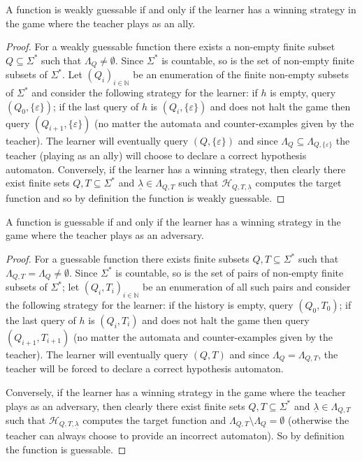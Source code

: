 \documentclass{lmcs}
\numberwithin{theorem}{section}
\begin{document}
\begin{prop}
A function is weakly guessable if and only if the learner has a winning strategy in the game where the teacher plays as an ally. 
\end{prop}

\begin{proof}
For a weakly guessable function there exists a non-empty finite subset $Q \subseteq \Sigma^*$ such that $\Lambda_{Q} \neq \emptyset$. Since $\Sigma^*$ is countable, so is the set of non-empty finite subsets of $\Sigma^*$. Let $(Q_i)_{i\in \mathbb{N}}$ be an enumeration of the finite non-empty subsets of $\Sigma^*$ and consider the following strategy for the learner: if $h$ is empty, query $(Q_0, \{\varepsilon\})$; if the last query of $h$ is $(Q_i, \{\varepsilon\})$ and does not halt the game then query $(Q_{i+1}, \{\varepsilon\})$ (no matter the automata and counter-examples given by the teacher). The learner will eventually query $(Q,\{\varepsilon\})$ and since $\Lambda_{Q} \subseteq \Lambda_{Q,\{\varepsilon\}}$ the teacher (playing as an ally) will choose to declare a correct hypothesis automaton. Conversely, if the learner has a winning strategy, then clearly there exist finite sets $Q, T \subseteq \Sigma^*$ and $\underline{\lambda} \in \Lambda_{Q, T}$ such that $\mathcal{H}_{Q, T, \underline{\lambda}}$ computes the target function and so by definition the function is weakly guessable.
\end{proof}

\begin{prop}
\label{prop:guessgame}A function is guessable if and only if the learner has a winning strategy in the game where the teacher plays as an adversary. 
\end{prop}

\begin{proof}
For a guessable function there exists finite subsets $Q, T \subseteq \Sigma^*$ such that $\Lambda_{Q,T} = \Lambda_{Q} \neq \emptyset$. Since $\Sigma^*$ is countable, so is the set of pairs of non-empty finite subsets of $\Sigma^*$; let $(Q_i, T_i)_{i\in \mathbb{N}}$ be an enumeration of all such pairs and consider the following strategy for the learner: if the history is empty, query  $(Q_0,T_0)$; if the last query of $h$ is $(Q_i, T_i)$ and does not halt the game then query $(Q_{i+1}, T_{i+1})$ (no matter the automata and counter-examples given by the teacher). The learner will eventually query $(Q,T)$ and since $\Lambda_{Q} = \Lambda_{Q,T}$, the teacher will be forced to declare a  correct hypothesis automaton.

Conversely, if the learner has a winning strategy in the game where the teacher plays as an adversary, then clearly there exist finite sets $Q, T \subseteq \Sigma^*$ and $\underline{\lambda} \in \Lambda_{Q, T}$ such that $\mathcal{H}_{Q, T, \underline{\lambda}}$ computes the target function and $\Lambda_{Q, T} \setminus \Lambda_Q = \emptyset$ (otherwise the teacher can always choose to provide an incorrect automaton). So by definition the function is guessable.
\end{proof}
\end{document}
